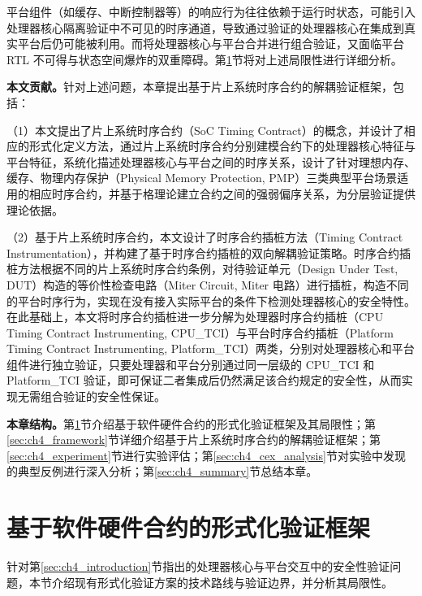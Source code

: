 平台组件（如缓存、中断控制器等）的响应行为往往依赖于运行时状态，可能引入处理器核心隔离验证中不可见的时序通道，导致通过验证的处理器核心在集成到真实平台后仍可能被利用。而将处理器核心与平台合并进行组合验证，又面临平台 RTL 不可得与状态空间爆炸的双重障碍。第\ref{sec:ch4_problem}节将对上述局限性进行详细分析。

\textbf{本文贡献。}针对上述问题，本章提出基于片上系统时序合约的解耦验证框架，包括：

（1）本文提出了片上系统时序合约（SoC Timing Contract）的概念，并设计了相应的形式化定义方法，通过片上系统时序合约分别建模合约下的处理器核心特征与平台特征，系统化描述处理器核心与平台之间的时序关系，设计了针对理想内存、缓存、物理内存保护（Physical Memory Protection, PMP）三类典型平台场景适用的相应时序合约，并基于格理论建立合约之间的强弱偏序关系，为分层验证提供理论依据。

（2）基于片上系统时序合约，本文设计了时序合约插桩方法（Timing Contract Instrumentation），并构建了基于时序合约插桩的双向解耦验证策略。时序合约插桩方法根据不同的片上系统时序合约条例，对待验证单元（Design Under Test, DUT）构造的等价性检查电路（Miter Circuit, Miter 电路）进行插桩，构造不同的平台时序行为，实现在没有接入实际平台的条件下检测处理器核心的安全特性。在此基础上，本文将时序合约插桩进一步分解为处理器时序合约插桩（CPU Timing Contract Instrumenting, CPU\_TCI）与平台时序合约插桩（Platform Timing Contract Instrumenting, Platform\_TCI）两类，分别对处理器核心和平台组件进行独立验证，只要处理器和平台分别通过同一层级的 CPU\_TCI 和 Platform\_TCI 验证，即可保证二者集成后仍然满足该合约规定的安全性，从而实现无需组合验证的安全性保证。

\textbf{本章结构。}第\ref{sec:ch4_problem}节介绍基于软件硬件合约的形式化验证框架及其局限性；第\ref{sec:ch4_framework}节详细介绍基于片上系统时序合约的解耦验证框架；第\ref{sec:ch4_experiment}节进行实验评估；第\ref{sec:ch4_cex_analysis}节对实验中发现的典型反例进行深入分析；第\ref{sec:ch4_summary}节总结本章。


\section{基于软件硬件合约的形式化验证框架}
\label{sec:ch4_problem}

针对第\ref{sec:ch4_introduction}节指出的处理器核心与平台交互中的安全性验证问题，本节介绍现有形式化验证方案的技术路线与验证边界，并分析其局限性。

